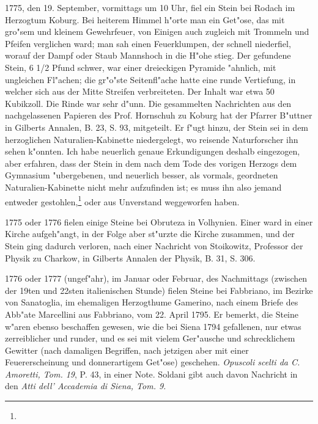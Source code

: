 \documentclass[a4paper, 11pt, oneside, polutonikogreek, german]{article}
\begin{document}
1775, den 19. September, vormittags um 10 Uhr, fiel ein Stein bei Rodach im Herzogtum Koburg. Bei heiterem Himmel h"orte man ein Get"ose, das mit gro"sem und kleinem Gewehrfeuer, von Einigen auch zugleich mit Trommeln und Pfeifen verglichen ward; man sah einen Feuerklumpen, der schnell niederfiel, worauf der Dampf oder Staub Mannshoch in die H"ohe stieg. Der gefundene Stein, 6 1/2 Pfund schwer, war einer dreieckigen Pyramide "ahnlich, mit ungleichen Fl"achen; die gr"o"ste Seitenfl"ache hatte eine runde Vertiefung, in welcher sich aus der Mitte Streifen verbreiteten. Der Inhalt war etwa 50 Kubikzoll. Die Rinde war sehr d"unn. Die gesammelten Nachrichten aus den nachgelassenen Papieren des Prof. Hornschuh zu Koburg hat der Pfarrer B"uttner in Gilberts Annalen, B. 23, S. 93, mitgeteilt. Er f"ugt hinzu, der Stein sei in dem herzoglichen Naturalien-Kabinette niedergelegt, wo reisende Naturforscher ihn sehen k"onnten. Ich habe neuerlich genaue Erkundigungen deshalb eingezogen, aber erfahren, dass der Stein in dem nach dem Tode des vorigen Herzogs dem Gymnasium "ubergebenen, und neuerlich besser, als vormals, geordneten Naturalien-Kabinette nicht mehr aufzufinden ist; es muss ihn also jemand entweder gestohlen,\footnote{} oder aus Unverstand weggeworfen haben.

1775 oder 1776 fielen einige Steine bei Obruteza in Volhynien. Einer ward in einer Kirche aufgeh"angt, in der Folge aber st"urzte die Kirche zusammen, und der Stein ging dadurch verloren, nach einer Nachricht von Stoikowitz, Professor der Physik zu Charkow, in Gilberts Annalen der Physik, B. 31, S. 306.

1776 oder 1777 (ungef"ahr), im Januar oder Februar, des Nachmittags (zwischen der 19ten und 22sten italienischen Stunde) fielen Steine bei Fabbriano, im Bezirke von Sanatoglia, im ehemaligen Herzogthume Gamerino, nach einem Briefe des Abb"ate Marcellini aus Fabbriano, vom 22. April 1795. Er bemerkt, die Steine w"aren ebenso beschaffen gewesen, wie die bei Siena 1794 gefallenen, nur etwas zerreiblicher und runder, und es sei mit vielem Ger"ausche und schrecklichem Gewitter (nach damaligen Begriffen, nach jetzigen aber mit einer Feuererscheinung und donnerartigem Get"ose) geschehen. \emph{Opuscoli scelti da C. Amoretti, Tom. 19}, P. 43, in einer Note. Soldani gibt auch davon Nachricht in den \emph{Atti dell' Accademia di Siena, Tom. 9.}
\end{document}
